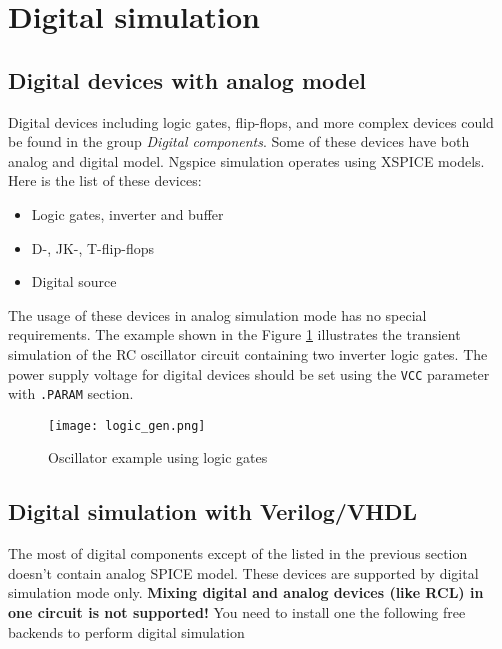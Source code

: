 \section{Digital simulation}

\subsection{Digital devices with analog model}

Digital devices including logic gates, flip-flops, and more complex devices could be found in the group \emph{Digital components}. Some of these devices have both analog and digital model. Ngspice simulation operates using XSPICE models. Here is the list of these devices:

\begin{itemize}
 \item Logic gates, inverter and buffer
 \item D-, JK-, T-flip-flops
 \item Digital source
\end{itemize}

The usage of these devices in analog simulation mode has no special requirements. The example shown in the Figure \ref{fig:logic_gen} illustrates the transient simulation of the RC oscillator circuit containing two inverter logic gates. The power supply voltage for digital devices should be set using the \verb|VCC| parameter with \verb|.PARAM| section.

    \begin{figure}[!ht]
    \begin{center}
        \texttt{[image: logic\_gen.png]}
    \end{center}
    \caption{Oscillator example using logic gates} \label{fig:logic_gen}
    \end{figure}


\subsection{Digital simulation with Verilog/VHDL} \label{sec:digi}

The most of digital components except of the listed in the previous section doesn't contain analog SPICE model. These devices are  supported by digital simulation mode only. \textbf{Mixing digital and analog devices (like RCL) in one circuit is not supported!} You need to install one the following free backends to perform digital simulation

